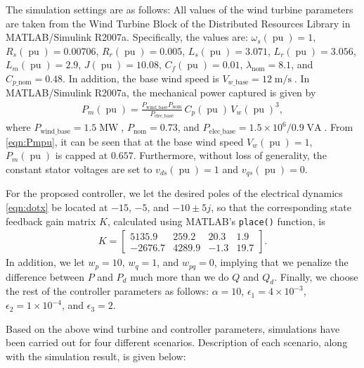 \documentclass[journal]{IEEEtran}
\begin{document}
The simulation settings are as follows: All values of the wind turbine parameters are taken from the Wind Turbine Block of the Distributed Resources Library in MATLAB/Simulink R2007a. Specifically, the values are: $\omega_s(\operatorname{pu})=1$, $R_s(\operatorname{pu})=0.00706$, $R_r(\operatorname{pu})=0.005$, $L_s(\operatorname{pu})=3.071$, $L_r(\operatorname{pu})=3.056$, $L_m(\operatorname{pu})=2.9$, $J(\operatorname{pu})=10.08$, $C_f(\operatorname{pu})=0.01$, $\lambda_{\text{nom}}=8.1$, and $C_{p\_\text{nom}}=0.48$. In addition, the base wind speed is $V_{w\_\text{base}}=12\operatorname{m/s}$. In MATLAB/Simulink R2007a, the mechanical power captured is given by
\begin{align}
P_m(\operatorname{pu})=\frac{P_{\text{wind}\_\text{base}}P_\text{nom}}{P_{\text{elec}\_\text{base}}}\,C_p(\operatorname{pu})\,V_w(\operatorname{pu})^3,\label{eqn:Pmpu}
\end{align}
where $P_{\text{wind}\_\text{base}}=1.5\operatorname{MW}$, $P_{\text{nom}}=0.73$, and $P_{\text{elec}\_\text{base}}=1.5\times10^6/0.9\operatorname{VA}$. From \eqref{eqn:Pmpu}, it can be seen that at the base wind speed $V_w(\operatorname{pu})=1$, $P_m(\operatorname{pu})$ is capped at $0.657$. Furthermore, without loss of generality, the constant stator voltages are set to $v_{ds}(\operatorname{pu})=1$ and $v_{qs}(\operatorname{pu})=0$.

For the proposed controller, we let the desired poles of the electrical dynamics \eqref{eqn:dotx} be located at $-15$, $-5$, and $-10\pm5j$, so that the corresponding state feedback gain matrix $K$, calculated using MATLAB's {\tt place()} function, is
\begin{align*}
K=
\begin{bmatrix}
5135.9 & 259.2 & 20.3 & 1.9\\
-2676.7 & 4289.9 & -1.3 & 19.7
\end{bmatrix}.
\end{align*}
In addition, we let $w_p=10$, $w_q=1$, and $w_{pq}=0$, implying that we penalize the difference between $P$ and $P_d$ much more than we do $Q$ and $Q_d$. Finally, we choose the rest of the controller parameters as follows: $\alpha=10$, $\epsilon_1=4\times10^{-3}$, $\epsilon_2=1\times10^{-4}$, and $\epsilon_3=2$.

Based on the above wind turbine and controller parameters, simulations have been carried out for four different scenarios. Description of each scenario, along with the simulation result, is given below:
\end{document}
